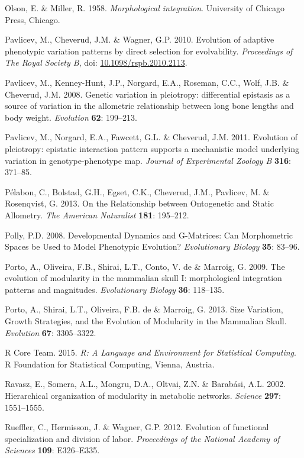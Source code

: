 \documentclass[12pt,]{article}
\begin{document}
Olson, E. \& Miller, R. 1958. \emph{Morphological integration}.
University of Chicago Press, Chicago.

Pavlicev, M., Cheverud, J.M. \& Wagner, G.P. 2010. Evolution of adaptive
phenotypic variation patterns by direct selection for evolvability.
\emph{Proceedings of The Royal Society B}, doi:
\href{http://dx.doi.org/10.1098/rspb.2010.2113}{10.1098/rspb.2010.2113}.

Pavlicev, M., Kenney-Hunt, J.P., Norgard, E.A., Roseman, C.C., Wolf,
J.B. \& Cheverud, J.M. 2008. Genetic variation in pleiotropy:
differential epistasis as a source of variation in the allometric
relationship between long bone lengths and body weight. \emph{Evolution}
\textbf{62}: 199--213.

Pavlicev, M., Norgard, E.A., Fawcett, G.L. \& Cheverud, J.M. 2011.
Evolution of pleiotropy: epistatic interaction pattern supports a
mechanistic model underlying variation in genotype-phenotype map.
\emph{Journal of Experimental Zoology B} \textbf{316}: 371--85.

Pélabon, C., Bolstad, G.H., Egset, C.K., Cheverud, J.M., Pavlicev, M. \&
Rosenqvist, G. 2013. On the Relationship between Ontogenetic and Static
Allometry. \emph{The American Naturalist} \textbf{181}: 195--212.

Polly, P.D. 2008. Developmental Dynamics and G-Matrices: Can
Morphometric Spaces be Used to Model Phenotypic Evolution?
\emph{Evolutionary Biology} \textbf{35}: 83--96.

Porto, A., Oliveira, F.B., Shirai, L.T., Conto, V. de \& Marroig, G.
2009. The evolution of modularity in the mammalian skull I:
morphological integration patterns and magnitudes. \emph{Evolutionary
Biology} \textbf{36}: 118--135.

Porto, A., Shirai, L.T., Oliveira, F.B. de \& Marroig, G. 2013. Size
Variation, Growth Strategies, and the Evolution of Modularity in the
Mammalian Skull. \emph{Evolution} \textbf{67}: 3305--3322.

R Core Team. 2015. \emph{R: A Language and Environment for Statistical
Computing}. R Foundation for Statistical Computing, Vienna, Austria.

Ravasz, E., Somera, A.L., Mongru, D.A., Oltvai, Z.N. \& Barabási, A.L.
2002. Hierarchical organization of modularity in metabolic networks.
\emph{Science} \textbf{297}: 1551--1555.

Rueffler, C., Hermisson, J. \& Wagner, G.P. 2012. Evolution of
functional specialization and division of labor. \emph{Proceedings of
the National Academy of Sciences} \textbf{109}: E326--E335.
\end{document}
